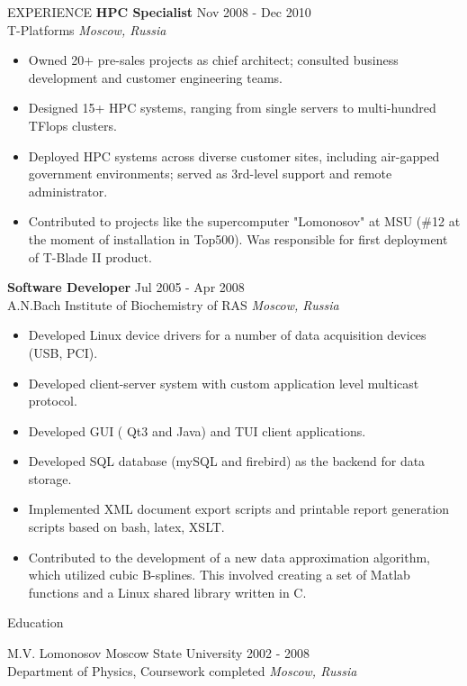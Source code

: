 \documentclass{resume} %
\begin{document}
\begin{rSection}{EXPERIENCE}
\textbf{HPC Specialist} \hfill Nov 2008 - Dec 2010\\
T-Platforms \hfill \textit{Moscow, Russia}
 \begin{itemize}
    \itemsep -3pt {}
    \item Owned 20+ pre-sales projects as chief architect; consulted business development and customer engineering teams.
    \item Designed 15+ HPC systems, ranging from single servers to multi-hundred TFlops clusters.
    \item Deployed HPC systems across diverse customer sites, including air-gapped government environments; served as 3rd-level support and remote administrator.
    \item Contributed to projects like the supercomputer "Lomonosov" at MSU (\#12 at the moment of installation in Top500). Was responsible for first deployment of T-Blade II product.
 \end{itemize}

\textbf{Software Developer} \hfill Jul 2005 - Apr 2008\\
A.N.Bach Institute of Biochemistry of RAS \hfill \textit{Moscow, Russia}
 \begin{itemize}
    \itemsep -3pt {}
    \item Developed Linux device drivers for a number of data acquisition devices (USB, PCI).
    \item Developed client-server system with custom application level multicast protocol.
    \item Developed GUI ( Qt3 and Java) and TUI client applications.
    \item Developed SQL database (mySQL and firebird) as the backend for data storage.
    \item Implemented XML document export scripts and printable report generation scripts based on bash, latex, XSLT.
    \item Contributed to the development of a new data approximation algorithm, which utilized cubic B-splines. This involved creating a set of Matlab functions and a Linux shared library written in C.
 \end{itemize}

\end{rSection}


\begin{rSection}{Education}

M.V. Lomonosov Moscow State University \hfill {2002 - 2008}\\
Department of Physics, Coursework completed \hfill \textit{Moscow, Russia}

\end{rSection}
\end{document}

